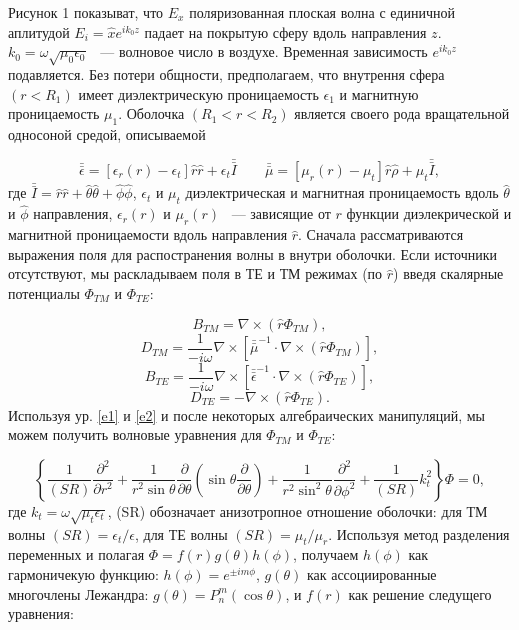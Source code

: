 \documentclass[a4paper, 12pt]{article}
\newcommand{\dbar}[1]{\bar{\bar{#1}}}
\begin{document}
Рисунок 1 показыват, что $E_x$ поляризованная плоская волна с единичной аплитудой
$E_i=\hat{x}e^{ik_0z}$ падает на покрытую сферу вдоль направления $z$. 
$k_0=\omega\sqrt{\mu_0\epsilon_0}$ ~--- волновое число в воздухе. Временная 
зависимость $e^{ik_0z}$ подавляется. Без потери общности, предполагаем, что
внутрення сфера $(r<R_1)$ имеет диэлектрическую проницаемость $\epsilon_1$ и
магнитную проницаемость $\mu_1$. Оболочка $(R_1<r<R_2)$ является своего рода
вращательной односоной средой, описываемой

\begin{equation}\label{e1}
	\dbar{\epsilon} = [\epsilon_r(r)-\epsilon_t]\hat{r}\hat{r}+\epsilon_t\dbar{I}
	\qquad
	\dbar{\mu} = [\mu_r(r)-\mu_t]\hat{r}\hat{\rho} + \mu_t \dbar{I},
\end{equation}
где $\dbar{I}=\hat{r}\hat{r}+\hat{\theta}\hat{\theta}+\hat{\phi}\hat{\phi}$,
$\epsilon_t$ и $\mu_t$ диэлектрическая и магнитная проницаемость вдоль
$\hat{\theta}$ и $\hat{\phi}$ направления, $\epsilon_r(r)$ и $\mu_r(r)$ ~--- 
зависящие от $r$ функции диэлекрической и магнитной проницаемости вдоль направления
$\hat{r}$. Сначала рассматриваются выражения поля для распостранения волны в 
внутри оболочки. Если источники отсутствуют, мы раскладываем поля в ТЕ и ТМ
режимах (по $\hat{r}$) введя скалярные потенциалы $\Phi_{TM}$ и $\Phi_{TE}$:

\begin{equation*}
	B_{TM} = \nabla \times (\hat{r}\Phi_{TM}),
\end{equation*}
\begin{equation*}
	D_{TM} = \frac{1}{-i\omega}{\nabla\times[\dbar{\mu}^{-1} \cdot \nabla \times
	(\hat{r}\Phi_{TM})]},
\end{equation*}
\begin{equation}\label{e2}
B_{TE} = \frac{1}{-i\omega}{\nabla\times[\dbar{\epsilon}^{-1} \cdot \nabla \times
	(\hat{r}\Phi_{TE})]},	
\end{equation}
\begin{equation*}
	D_{TE} = - \nabla \times (\hat{r}\Phi_{TE}).
\end{equation*}
Используя ур. \eqref{e1} и \eqref{e2} и после некоторых алгебраических манипуляций,
мы можем получить волновые уравнения для $\Phi_{TM}$ и $\Phi_{TE}$:

\begin{equation}\label{e3}
\left\{
\frac{1}{(SR)}
\frac{\partial^2}{\partial r^2} + \frac{1}{r^2\sin\theta}
\frac{\partial}{\partial\theta}
\left(\sin\theta \frac{\partial}{\partial\theta}\right) +
\frac{1}{r^2\sin^2\theta}\frac{\partial^2}{\partial\phi^2} + 
\frac{1}{(SR)}k^2_t
\right\}\Phi = 0,
\end{equation}
где $k_t = \omega \sqrt{\mu_t\epsilon_t}$, (SR) обозначает анизотропное отношение
оболочки: для ТМ волны $(SR) = \epsilon_t/\epsilon$, для ТЕ волны $(SR) = 
\mu_t/\mu_r$. Используя метод разделения переменных и полагая 
$\Phi = f(r)g(\theta)h(\phi)$, получаем $h(\phi)$ как гармоничекую функцию:
$h(\phi) = e^{\pm im\phi}$, $g(\theta)$ как ассоциированные многочлены Лежандра: 
$g(\theta) = P_n^m(\cos\theta)$, и $f(r)$ как решение следущего уравнения:
\end{document}
